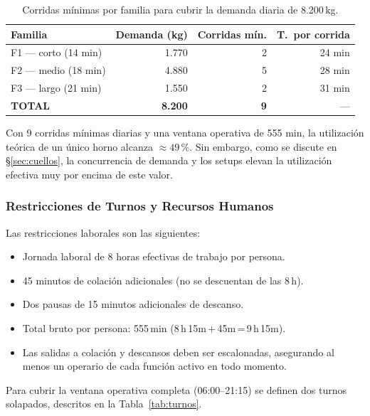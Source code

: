 \documentclass[10pt, a4paper]{article}
\begin{document}
\begin{table}[H]
\centering
\caption{Corridas m\'inimas por familia para cubrir la demanda diaria de 8.200\,kg.}
\label{tab:corridas_min}
\renewcommand{\arraystretch}{1.20}
\begin{tabular}{l r r r}
\toprule
\rowcolor{azulClaro}
\textbf{Familia} & \textbf{Demanda (kg)} & \textbf{Corridas m\'in.} & \textbf{T.\ por corrida} \\
\midrule
F1 --- corto (14 min) & 1.770 & 2 & 24 min \\
\rowcolor{grisClaro}
F2 --- medio (18 min) & 4.880 & 5 & 28 min \\
F3 --- largo (21 min) & 1.550 & 2 & 31 min \\
\midrule
\rowcolor{azulClaro}
\textbf{TOTAL} & \textbf{8.200} & \textbf{9} & --- \\
\bottomrule
\end{tabular}
\end{table}

Con 9 corridas m\'inimas diarias y una ventana operativa de 555 min, la
utilizaci\'on te\'orica de un \'unico horno alcanza $\approx49\,\%$. Sin embargo,
como se discute en \S\ref{sec:cuellos}, la concurrencia de demanda y los setups
elevan la utilizaci\'on efectiva muy por encima de este valor.

\subsubsection{Restricciones de Turnos y Recursos Humanos}

Las restricciones laborales son las siguientes:

\begin{itemize}
  \item Jornada laboral de 8 horas efectivas de trabajo por persona.
  \item 45 minutos de colaci\'on adicionales (no se descuentan de las 8\,h).
  \item Dos pausas de 15 minutos adicionales de descanso.
  \item Total bruto por persona: 555\,min (8\,h\,15m\,+\,45m\,=\,9\,h\,15m).
  \item Las salidas a colaci\'on y descansos deben ser escalonadas,
    asegurando al menos un operario de cada funci\'on activo en todo momento.
\end{itemize}

Para cubrir la ventana operativa completa (06:00--21:15) se definen dos turnos
solapados, descritos en la Tabla~\ref{tab:turnos}.
\end{document}
